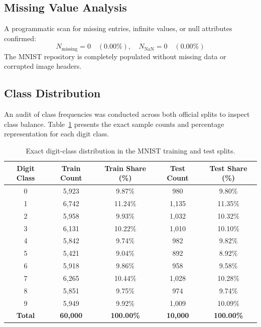 \documentclass[12pt, a4paper]{article}
\begin{document}
\subsection{Missing Value Analysis}
A programmatic scan for missing entries, infinite values, or null attributes confirmed:
\begin{equation}
    N_{\text{missing}} = 0 \quad (0.00\%), \quad N_{\text{NaN}} = 0 \quad (0.00\%)
\end{equation}
The MNIST repository is completely populated without missing data or corrupted image headers.

\subsection{Class Distribution}
An audit of class frequencies was conducted across both official splits to inspect class balance. Table~\ref{tab:class_distribution} presents the exact sample counts and percentage representation for each digit class.

\begin{table}[htbp]
\centering
\caption{Exact digit-class distribution in the MNIST training and test splits.}
\label{tab:class_distribution}
\small
\begin{tabularx}{0.85\textwidth}{ccccc}
\toprule
\textbf{Digit Class} & \textbf{Train Count} & \textbf{Train Share (\%)} & \textbf{Test Count} & \textbf{Test Share (\%)} \\
\midrule
0 & 5,923 & 9.87\% & 980  & 9.80\% \\
1 & 6,742 & 11.24\% & 1,135 & 11.35\% \\
2 & 5,958 & 9.93\% & 1,032 & 10.32\% \\
3 & 6,131 & 10.22\% & 1,010 & 10.10\% \\
4 & 5,842 & 9.74\% & 982  & 9.82\% \\
5 & 5,421 & 9.04\% & 892  & 8.92\% \\
6 & 5,918 & 9.86\% & 958  & 9.58\% \\
7 & 6,265 & 10.44\% & 1,028 & 10.28\% \\
8 & 5,851 & 9.75\% & 974  & 9.74\% \\
9 & 5,949 & 9.92\% & 1,009 & 10.09\% \\
\midrule
\textbf{Total} & \textbf{60,000} & \textbf{100.00\%} & \textbf{10,000} & \textbf{100.00\%} \\
\bottomrule
\end{tabularx}
\end{table}
\end{document}
